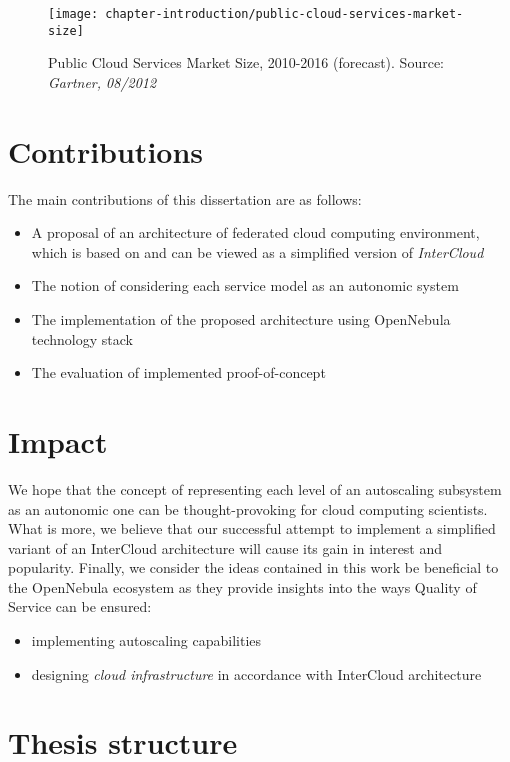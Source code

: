 \begin{figure}[!ht]
  \begin{center}
    \texttt{[image: chapter-introduction/public-cloud-services-market-size]}
  \end{center}
  \caption{Public Cloud Services Market Size, 2010-2016 (forecast). Source: \textit{Gartner, 08/2012}}
  \label{chapter-fig:public-cloud-services-market-size}
\end{figure}

\section{Contributions}
The main contributions of this dissertation are as follows:
\begin{itemize}
  \item A proposal of an architecture of federated cloud computing environment, which is based on and can be viewed as a simplified version of \emph{InterCloud}
  \item The notion of considering each service model as an autonomic system
  \item The implementation of the proposed architecture using OpenNebula technology stack
  \item The evaluation of implemented proof-of-concept
\end{itemize}

\section{Impact}
We hope that the concept of representing each level of an autoscaling subsystem as an autonomic one can be thought-provoking for cloud computing scientists.  What is more, we believe that our successful attempt to implement a simplified variant of an InterCloud architecture will cause its gain in interest and popularity. 
Finally, we consider the ideas contained in this work be beneficial to the OpenNebula ecosystem as they provide insights into the ways Quality of Service can be ensured:
\begin{itemize}
  \item implementing autoscaling capabilities
  \item designing \emph{cloud infrastructure} in accordance with InterCloud architecture
\end{itemize}

\section{Thesis structure}
